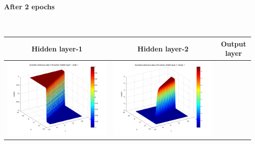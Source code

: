\documentclass[fleqn]{article}
\newcommand{\myparagraph}[1]{\paragraph{#1}\mbox{}\\}
\begin{document}
\myparagraph{After 2 epochs}
\begin{center}
  \begin{longtable}{ c | c | r }
	\multicolumn{1}{c}{Hidden layer-1 } & 
	\multicolumn{1}{c}{Hidden layer-2 } & 
	\multicolumn{1}{c}{Output layer} \\
    \hline
    \includegraphics[scale=0.25]{./pics/bivariate100/_2_4/_2_4_epoch_2_hidden layer 1 :1}  &  \includegraphics[scale=0.25]{./pics/bivariate100/_2_4/_2_4_epoch_2_hidden layer 2 :21} &  \\ 

\end{longtable}
\end{center}
\end{document}

